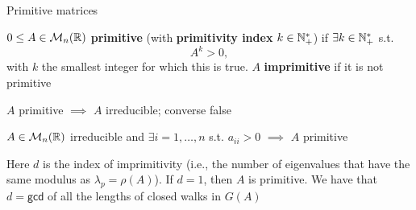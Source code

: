 \documentclass[aspectratio=169]{beamer}
\begin{document}
\begin{frame}{Primitive matrices}
\begin{definition}
$0\leq A\in\mathcal{M}_n(\mathbb{R})$ \textbf{primitive} (with \textbf{primitivity index} $k\in \mathbb{N}_{+}^{*}$) if $\exists k\in \mathbb{N}_{+}^{*}$ s.t.
\[
A^k>0,
\]
with $k$ the smallest integer for which this is true.
$A$ \textbf{imprimitive} if it is not primitive
\end{definition}
\vfill
$A$ primitive $\implies$ $A$ irreducible; converse false
\vfill
\begin{theorem}
	$A\in\mathcal{M}_n(\mathbb{R})$ irreducible and $\exists i=1,\ldots,n$ s.t. $a_{ii}>0$ $\implies$ $A$ primitive
\end{theorem}
\vfill
Here $d$ is the index of imprimitivity (i.e., the number of eigenvalues that have the same modulus as $\lambda_p=\rho(A)$). If $d=1$, then $A$ is primitive. We have that $d=\mathsf{gcd}$ of all the lengths of closed walks in $G(A)$
\end{frame}
\end{document}
